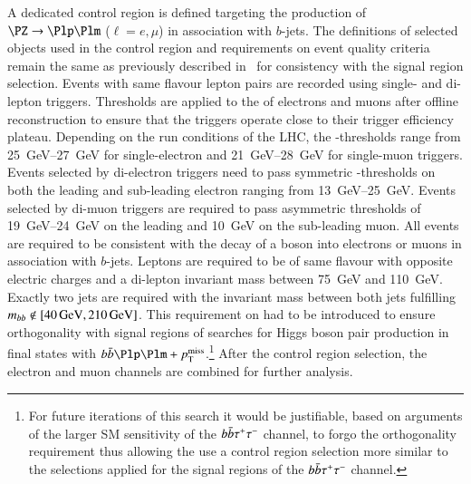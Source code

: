 A dedicated control region is defined targeting the production of
$\PZ \ra \Plp\Plm$ ($\ell = e , \mu$) in association with
$b$-jets. The definitions of selected objects used in the control
region and requirements on event quality criteria remain the same as
previously described
in~ for
consistency with the signal region selection. Events with same flavour
lepton pairs are recorded using single- and di-lepton
triggers. Thresholds are applied to the \pT of electrons and muons
after offline reconstruction to ensure that the triggers operate close
to their trigger efficiency plateau. Depending on the run conditions
of the LHC, the \pT-thresholds range from \SIrange{25}{27}{\GeV} for
single-electron and \SIrange{21}{28}{\GeV} for single-muon
triggers. Events selected by di-electron triggers need to pass
symmetric \pT-thresholds on both the leading and sub-leading electron
ranging from \SIrange{13}{25}{\GeV}. Events selected by di-muon
triggers are required to pass asymmetric thresholds of
\SIrange{19}{24}{\GeV} on the leading and \SI{10}{\GeV} on the
sub-leading muon. All events are required to be consistent with the
decay of a \PZ boson into electrons or muons in association with
$b$-jets. Leptons are required to be of same flavour with opposite
electric charges and a di-lepton invariant mass between \SI{75}{\GeV}
and \SI{110}{\GeV}. Exactly two \btagged jets are required with the
invariant mass between both jets
fulfilling~$\mBB \not\in [\SI{40}{\GeV}, \SI{210}{\GeV}]$. This
requirement on \mBB had to be introduced to ensure orthogonality with
signal regions of searches for Higgs boson pair production in final
states with $\bbbar\Plp\Plm + \pTmissAbs$.\footnote{For future
  iterations of this search it would be justifiable, based on
  arguments of the larger SM \HH sensitivity of the
  $b\bar{b}\tau^{+}\tau^{-}$ channel, to forgo the orthogonality
  requirement thus allowing the use a \ZHF control region selection
  more similar to the selections applied for the signal regions of the
  $b\bar{b}\tau^{+}\tau^{-}$ channel.} After the \ZHF control region
selection, the electron and muon channels are combined for further
analysis.

